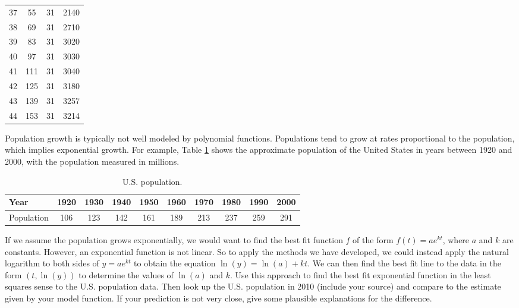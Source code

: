 \begin{minipage}{2.25in}
\begin{center}
\begin{tabular}{cccc}
37   &55  &31  &2140 \\
38   &69  &31  &2710 \\
39   &83  &31  &3020 \\
40   &97  &31  &3030 \\
41  &111  &31  &3040 \\
42  &125  &31  &3180 \\
43  &139  &31  &3257 \\
44  &153  &31  &3214 \\
\end{tabular}
\end{center}
\end{minipage} \hspace{0.5in}
\begin{minipage}{3in}
 \begin{center}
    \end{center}
\end{minipage}

\newpage
\begin{pactivity}  Population growth is typically not well modeled by polynomial functions. Populations tend to grow at rates proportional to the population, which implies exponential growth. For example, Table \ref{T:7_d_US_population} shows the approximate population of the United States in years between 1920 and 2000, with the population measured in millions. 
\begin{table}[h]
\begin{center}
\begin{tabular}{|l||c|c|c|c|c|c|c|c|c|} \hline
Year			&1920	&1930	&1940	&1950	&1960	&1970	&1980	&1990	&2000 \\ \hline
Population	&106		&123		&142		&161		&189		&213		&237		&259		&291  \\ \hline
\end{tabular}
\end{center}
\caption{U.S. population.}
\label{T:7_d_US_population}
\end{table}
If we assume the population grows exponentially, we would want to find the best fit function $f$ of the form $f(t) = ae^{kt}$, where $a$ and $k$ are constants. However, an exponential function is not linear. So to apply the methods we have developed, we could instead apply the natural logarithm to both sides of $y = ae^{kt}$ to obtain the equation $\ln(y) = \ln(a) + kt$. We can then find the best fit line to the data in the form $(t, \ln(y))$ to determine the values of $\ln(a)$ and $k$. Use this approach to find the best fit exponential function in the least squares sense to the U.S. population data. Then look up the U.S. population in 2010 (include your source) and compare to the estimate given by your model function. If your prediction is not very close, give some plausible explanations for the difference. 

\end{pactivity}

